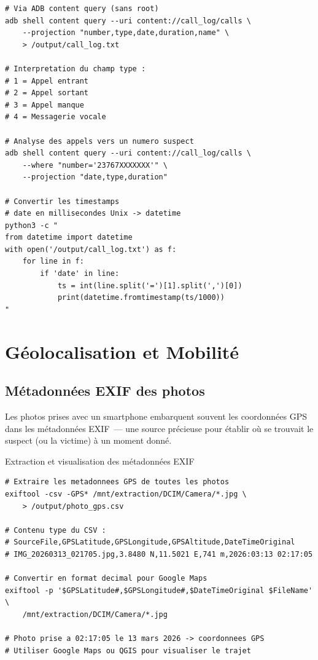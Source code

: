\begin{lstlisting}[language=bash_forensique,
    caption={Extraction des journaux d'appels}]
# Via ADB content query (sans root)
adb shell content query --uri content://call_log/calls \
    --projection "number,type,date,duration,name" \
    > /output/call_log.txt

# Interpretation du champ type :
# 1 = Appel entrant
# 2 = Appel sortant
# 3 = Appel manque
# 4 = Messagerie vocale

# Analyse des appels vers un numero suspect
adb shell content query --uri content://call_log/calls \
    --where "number='23767XXXXXXX'" \
    --projection "date,type,duration"

# Convertir les timestamps
# date en millisecondes Unix -> datetime
python3 -c "
from datetime import datetime
with open('/output/call_log.txt') as f:
    for line in f:
        if 'date' in line:
            ts = int(line.split('=')[1].split(',')[0])
            print(datetime.fromtimestamp(ts/1000))
"
\end{lstlisting}

\section{Géolocalisation et Mobilité}
\label{sec:geolocalisation}

\subsection{Métadonnées EXIF des photos}

Les photos prises avec un smartphone embarquent souvent les coordonnées
GPS dans les métadonnées EXIF~--- une source précieuse pour établir
où se trouvait le suspect (ou la victime) à un moment donné.

\begin{boxoutils}{Extraction et visualisation des métadonnées EXIF}
\begin{lstlisting}[language=bash_forensique]
# Extraire les metadonnees GPS de toutes les photos
exiftool -csv -GPS* /mnt/extraction/DCIM/Camera/*.jpg \
    > /output/photo_gps.csv

# Contenu type du CSV :
# SourceFile,GPSLatitude,GPSLongitude,GPSAltitude,DateTimeOriginal
# IMG_20260313_021705.jpg,3.8480 N,11.5021 E,741 m,2026:03:13 02:17:05

# Convertir en format decimal pour Google Maps
exiftool -p '$GPSLatitude#,$GPSLongitude#,$DateTimeOriginal $FileName' \
    /mnt/extraction/DCIM/Camera/*.jpg

# Photo prise a 02:17:05 le 13 mars 2026 -> coordonnees GPS
# Utiliser Google Maps ou QGIS pour visualiser le trajet
\end{lstlisting}
\end{boxoutils}

